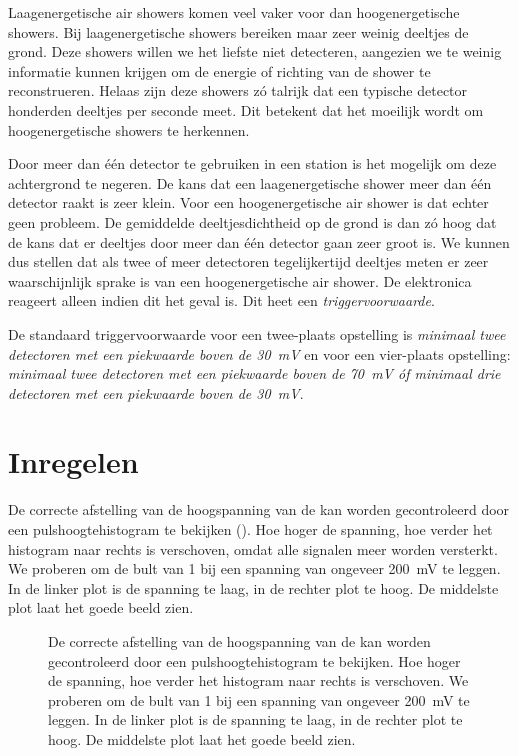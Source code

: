 Laagenergetische air showers komen veel vaker voor dan hoogenergetische
showers.  Bij laagenergetische showers bereiken maar zeer weinig deeltjes
de grond.  Deze showers willen we het liefste niet detecteren, aangezien
we te weinig informatie kunnen krijgen om de energie of richting van de
shower te reconstrueren.  Helaas zijn deze showers zó talrijk dat een
typische \hisparc detector honderden deeltjes per seconde meet.  Dit
betekent dat het moeilijk wordt om hoogenergetische showers te herkennen.

Door meer dan één detector te gebruiken in een station is het mogelijk om
deze achtergrond te negeren.  De kans dat een laagenergetische shower meer
dan één detector raakt is zeer klein.  Voor een hoogenergetische air
shower is dat echter geen probleem.  De gemiddelde deeltjesdichtheid op de
grond is dan zó hoog dat de kans dat er deeltjes door meer dan één
detector gaan zeer groot is.  We kunnen dus stellen dat als twee of meer
detectoren tegelijkertijd deeltjes meten er zeer waarschijnlijk sprake is
van een hoogenergetische air shower.  De \hisparc elektronica reageert
alleen indien dit het geval is.  Dit heet een \emph{triggervoorwaarde}.

De standaard triggervoorwaarde voor een twee-plaats opstelling is
\emph{minimaal twee detectoren met een piekwaarde boven de
\SI{30}{\milli\volt}} en voor een vier-plaats opstelling: \emph{minimaal
twee detectoren met een piek\-waarde boven de \SI{70}{\milli\volt} óf
minimaal drie detectoren met een piekwaarde boven de
\SI{30}{\milli\volt}}.


\section{Inregelen \pmts}

De correcte afstelling van de hoogspanning van de \pmt kan worden
gecontroleerd door een pulshoogtehistogram te bekijken
().  Hoe hoger de spanning, hoe verder het
histogram naar rechts is verschoven, omdat alle signalen meer worden
versterkt.  We proberen om de bult van \SI{1}{\mip} bij een spanning van
ongeveer \SI{200}{\milli\volt} te leggen.  In de linker plot is de
spanning te laag, in de rechter plot te hoog.  De middelste plot laat het
goede beeld zien.

\begin{figure}
\centering
{}

\caption{De correcte afstelling van de hoogspanning van de \pmt kan worden
gecontroleerd door een pulshoogtehistogram te bekijken.  Hoe hoger de
spanning, hoe verder het histogram naar rechts is verschoven.  We proberen
om de bult van \SI{1}{\mip} bij een spanning van ongeveer
\SI{200}{\milli\volt} te leggen.  In de linker plot is de spanning te
laag, in de rechter plot te hoog.  De middelste plot laat het goede beeld
zien.}
\label{fig:afstelling_pmt}
\end{figure}


